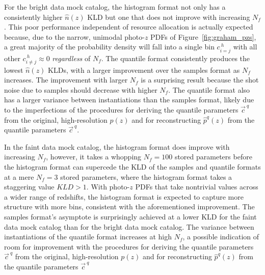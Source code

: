 \documentclass[\docopts]{\docclass}
\newcommand{\pz}{photo-$z$ PDF}
\newcommand{\mgdata}{bright\xspace}
\newcommand{\ssdata}{faint\xspace}
\begin{document}
For the \mgdata data mock catalog, the histogram format not only has a 
consistently higher $\hat{n}(z)$ KLD but one that does not improve with 
increasing $N_{f}$.
This poor performance independent of resource allocation is actually expected 
because, due to the narrow, unimodal \pz s of Figure~\ref{fig:graham_pzs}, a 
great majority of the probability density will fall into a single bin $c^{\ 
h}_{i=j}$ with all other $c^{\ h}_{i\neq j}\approx 0$ \textit{regardless} of 
$N_{f}$.
The quantile format consistently produces the lowest $\hat{n}(z)$ KLDs, with a 
larger improvement over the samples format as $N_{f}$ increases.
The improvement with larger $N_{f}$ is a surprising result because the shot 
noise due to samples should decrease with higher $N_{f}$.
The quantile format also has a larger variance between instantiations than the 
samples format, likely due to the imperfections of the procedures for deriving 
the quantile parameters $\vec{c}^{\ q}$ from the original, high-resolution 
$p(z)$ and for reconstructing $\hat{p}^{q}(z)$ from the quantile parameters 
$\vec{c}^{\ q}$.

In the \ssdata data mock catalog, the histogram format does improve with 
increasing $N_{f}$, however, it takes a whopping $N_{f}=100$ stored parameters 
before the histogram format can supercede the KLD of the samples and quantile 
formats at a mere $N_{f}=3$ stored parameters, where the histogram format takes 
a staggering value $KLD>1$.
With \pz s that take nontrivial values across a wider range of redshifts, the 
histogram format is expected to capture more structure with more bins, 
consistent with the aforementioned improvement.
The samples format's asymptote is surprisingly achieved at a lower KLD for the 
\ssdata data mock catalog than for the \mgdata data mock catalog.
The variance between instantiations of the quantile format increases at high 
$N_{f}$, a possible indication of room for improvement with the procedures for 
deriving the quantile parameters $\vec{c}^{\ q}$ from the original, 
high-resolution $p(z)$ and for reconstructing $\hat{p}^{q}(z)$ from the 
quantile parameters $\vec{c}^{\ q}$
\end{document}
